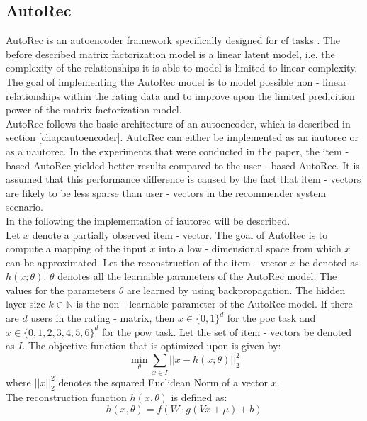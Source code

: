 \subsection{AutoRec}
AutoRec is an autoencoder framework specifically designed for \acrshort{cf} tasks \cite{sedhain2015autorec}.
The before described matrix factorization model is a linear latent model, i.e. the complexity of the relationships it is able to model is limited to linear complexity. The goal of implementing the AutoRec model is to model possible non - linear relationships within the rating data and to improve upon the limited predicition power of the matrix factorization model.\\
AutoRec follows the basic architecture of an autoencoder, which is described in section \ref{chap:autoencoder}. AutoRec can either be implemented as an \acrfull{iautorec} or as a \acrfull{uautorec}. In the experiments that were conducted in the paper, the item - based AutoRec yielded better results compared to the user - based AutoRec. It is assumed that this performance difference is caused by the fact that item - vectors are likely to be less sparse than user - vectors in the recommender system scenario.\\
In the following the implementation of \acrshort{iautorec} will be described.\\
Let $x$ denote a partially observed item - vector. The goal of AutoRec is to compute a mapping of the input $x$ into a low - dimensional space from which $x$ can be approximated. Let the reconstruction of the item - vector $x$ be denoted as $h(x;\theta)$. $\theta$ denotes all the learnable parameters of the AutoRec model. The values for the parameters $\theta$ are learned by using backpropagation. The hidden layer size $k \in \mathbb{N}$ is the non - learnable parameter of the AutoRec model. If there are $d$ users in the rating - matrix, then $x \in \{0,1\}^{d}$ for the \acrshort{poc} task and $x \in \{0,1,2,3,4,5,6\}^{d}$ for the \acrshort{pow} task. Let the set of item - vectors be denoted as $I$. The objective function that is optimized upon is given by:
\begin{equation}
    \min_{\theta}\sum_{x \in I} ||x - h(x; \theta)||^{2}_{2}
\end{equation}
where $||x||_{2}^{2}$ denotes the squared Euclidean Norm of a vector $x$.\\
The reconstruction function $h(x, \theta)$ is defined as:\\
\begin{equation}
    h(x,\theta) = f(W \cdot g(Vx + \mu) + b)
\end{equation}

